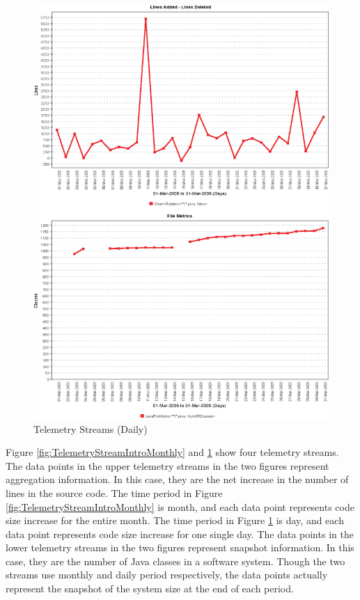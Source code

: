 \begin{figure}[p]
  \centering
  \includegraphics[height=0.90\textheight]{figures/TelemetryStreamIntro-Daily}
  \caption{Telemetry Streams (Daily)} 
  \label{fig:TelemetryStreamIntroDaily}
\end{figure}

Figure \ref{fig:TelemetryStreamIntroMonthly} and \ref{fig:TelemetryStreamIntroDaily} show four telemetry streams. 
The data points in the upper telemetry streams in the two figures represent aggregation information. In this case, they are the net increase in the number of lines in the source code. The time period in Figure \ref{fig:TelemetryStreamIntroMonthly} is month, and each data point represents code size increase for the entire month. The time period in Figure \ref{fig:TelemetryStreamIntroDaily} is day, and each data point represents code size increase for one single day. 
The data points in the lower telemetry streams in the two figures represent snapshot information. In this case, they are the number of Java classes in a software system. Though the two streams use monthly and daily period respectively, the data points actually represent the snapshot of the system size at the end of each period.

